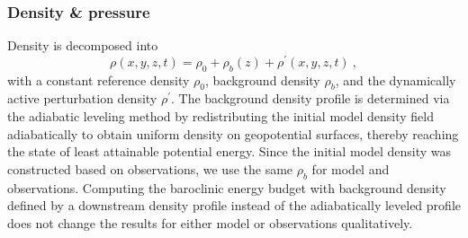 \documentclass{ametsocV6.1}
\begin{document}
\subsubsection{Density \& pressure}
Density is decomposed into
\begin{equation}
\rho(x,y,z,t) = \rho_0 + \rho_b(z)+ \rho^\prime(x,y,z,t)\ ,
\label{eq:DensityDecomposition}
\end{equation}
with a constant reference density $\rho_0$, background density $\rho_b$, and the dynamically active perturbation density $\rho^\prime$.
The background density profile is determined via the adiabatic leveling method \citep{brayfofonoff81, moumetal07} by redistributing the initial model density field adiabatically to obtain uniform density on geopotential surfaces, thereby reaching the state of least attainable potential energy.
Since the initial model density was constructed based on observations, we use the same $\rho_b$ for model and observations.
Computing the baroclinic energy budget with background density defined by a downstream density profile instead of the adiabatically leveled profile does not change the results for either model or observations qualitatively.
\end{document}
